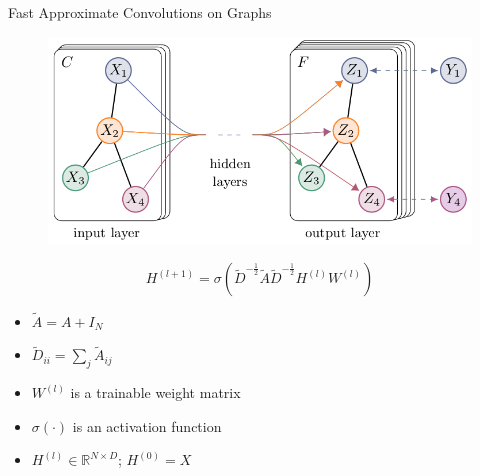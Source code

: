 \documentclass{beamer}
\begin{document}
\begin{frame}{Fast Approximate Convolutions on Graphs}
  \begin{figure}[H]
    \centering
    \includegraphics[width=1.0\textwidth, height=0.4\textheight, keepaspectratio]{img/gcn}
    \label{fig:gcn}
  \end{figure}
  \[
  { H }^{ (l+1) }=\sigma ({ \tilde { D }  }^{ -\frac { 1 }{ 2 }  }\tilde { A } { \tilde { D }  }^{ -\frac { 1 }{ 2 }  }{ H }^{ (l) }{ W }^{ (l) })
  \]
  \begin{itemize}
  \item $\tilde { A } =A+{ I }_{ N }$
  \item ${ \tilde { D }  }_{ ii }=\sum _{ j }^{  }{ { \tilde { A }  }_{ ij } } $
  \item $W^{(l)}$ is a trainable weight matrix
  \item $\sigma \left( \cdot  \right) $ is an activation function
  \item $H^{(l)} \in \mathbb{R}^{N \times D}$; $H^{(0)} = X$
  \end{itemize}
\end{frame}
\end{document}
